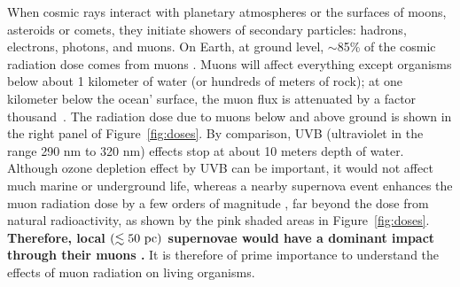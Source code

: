 \documentclass[a4paper,11pt]{article}
\begin{document}
 
 When cosmic rays interact with planetary atmospheres or the surfaces of  moons, asteroids or comets, they initiate showers of secondary particles: hadrons, electrons, photons, and muons.  On Earth, at ground level, $\sim$85\% of the cosmic radiation dose comes from muons \cite{GB20}. Muons will affect everything except organisms below about 1 kilometer of water (or hundreds of meters of rock); at  one kilometer below the ocean' surface, the muon flux is attenuated by a factor thousand~\cite{Bugaev98}. The radiation dose due to muons below and above ground is shown in the right panel of Figure~\ref{fig:doses}. By comparison, UVB (ultraviolet in the range 290 nm to 320 nm) effects stop at about 10 meters depth of water.  Although ozone depletion effect by UVB  can be important, it would not affect much marine or underground life, whereas a nearby supernova event enhances the  muon radiation dose by a few orders of magnitude \cite{GFB21}, far beyond the dose from natural radioactivity, as shown  by the pink shaded areas in Figure~\ref{fig:doses}. {\bf Therefore, local $(\lesssim50~{\rm pc})$ supernovae would have a dominant impact through their muons \cite{thomas16,melott17}.} %
 It is therefore of prime importance to understand the effects of muon radiation on living organisms.  
 
\end{document}
